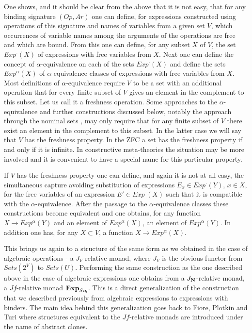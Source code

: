 \documentclass[12pt]{amsart}
\newcommand{\sr}{\rightarrow}
\newcommand{\nn}{{\bf N\rm}}
\begin{document}
One shows, and it should be clear from the above that it is not easy, that for any binding signature $(Op,Ar)$ one can define, for expressions constructed using operations of this signature and names of variables from a given set $V$, which occurrences of variable names among the arguments of the operations are free and which are bound. From this one can define, for any subset $X$ of $V$, the set $Exp^{\cdot}(X)$ of expressions with free variables from $X$. Next one can define the concept of $\alpha$-equivalence on each of the sets $Exp^{\cdot}(X)$ and define the sets $Exp^{\alpha}(X)$ of $\alpha$-equivalence classes of expressions with free variables from $X$. Most definitions of $\alpha$-equivalence require $V$ to be a set with an additional operation that for every finite subset of $V$ gives an element in the complement to this subset. Let us call it a freshness operation. Some approaches to the $\alpha$-equivalence and further constructions discussed below, notably the approach through the nominal sets \cite{Pitts}, may only require that for any finite subset of $V$ there exist an element in the complement to this subset. In the latter case we will say that $V$ has the freshness property. In the ZFC a set has the freshness property if and only if it is infinite. In constructive meta-theories the situation may be more involved and it is convenient to have a special name for this particular property.  

If $V$ has the freshness property one can define, and again it is not at all easy, the simultaneous capture avoiding substitution of expressions $E_x\in Exp^{\cdot}(Y)$, $x\in X$, for the free variables of an expression $E'\in Exp^{\cdot}(X)$ such that it is compatible with the $\alpha$-equivalence.  After the passage to the $\alpha$-equivalence classes these constructions become equivalent and one obtains, for any function $X\sr Exp^{\alpha}(Y)$ and an element of $Exp^{\alpha}(X)$, an element of $Exp^{\alpha}(Y)$. In addition one has, for any $X\subset V$, a function $X\sr Exp^{\alpha}(X)$. 

This brings us again to a structure of the same form as we obtained in the case of algebraic operations - a $J_V$-relative monad, where $J_V$ is the obvious functor from $Sets(2^V)$ to $Sets(U)$. Performing the same construction as the one described above in the case of algebraic expressions one obtains from a $J_{\nn}$-relative monad, a $Jf$-relative monad ${\bf Exp}_{Sig}$. This is a direct generalization of the construction that we described previously from algebraic expressions to expressions with binders. The main idea behind this generalization goes back to Fiore, Plotkin and Turi \cite{FPT} where structures equivalent to the $Jf$-relative monads are introduced under the name of abstract clones. 
\end{document}
